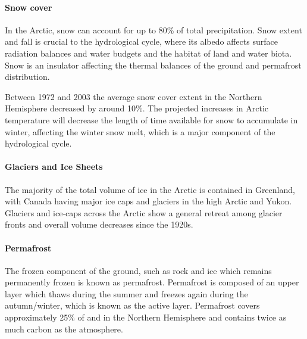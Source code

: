 \documentclass[12pt, oneside]{article}
\begin{document}
\paragraph{Snow cover}
In the Arctic, snow can account for up to 80\% of total precipitation. Snow extent and fall is crucial to the hydrological cycle, where its albedo affects surface radiation balances and water budgets and the habitat of land and water biota. Snow is an insulator affecting the thermal balances of the ground and permafrost distribution. 

Between 1972 and 2003 the average snow cover extent in the Northern Hemisphere decreased by around 10\%. The projected increases in Arctic temperature will decrease the length of time available for snow to accumulate in winter, affecting the winter snow melt, which is a major component of the hydrological cycle. 

\paragraph{Glaciers and Ice Sheets}
The majority of the total volume of ice in the Arctic is contained in Greenland, with Canada having major ice caps and glaciers in the high Arctic and Yukon. Glaciers and ice-caps across the Arctic show a general retreat among glacier fronts and overall volume decreases since the 1920s.


\paragraph{Permafrost}\label{permafrost}
The frozen component of the ground, such as rock and ice which remains permanently frozen is known as permafrost. Permafrost is composed of an upper layer which thaws during the summer and freezes again during the autumn/winter, which is known as the active layer. Permafrost covers approximately 25\% of and in the Northern Hemisphere and contains twice as much carbon as the atmosphere. 


{\color{blue}{try to find a more recent map than this one}


}
\end{document}
